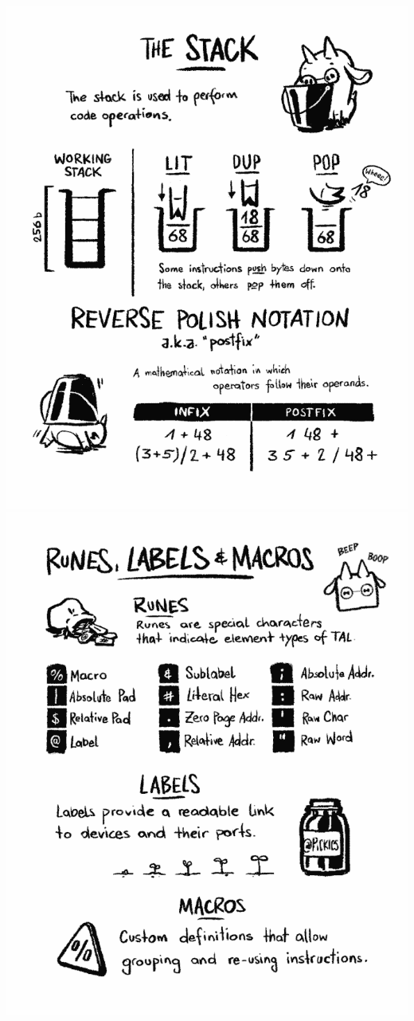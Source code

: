 \documentclass[paperheight=4.25in,paperwidth=2.75in,20pt]{article}
\begin{document}
  \includegraphics[width=1.0\paperwidth]{images/04_stack-680.png}
  \includegraphics[width=1.0\paperwidth]{images/05_runes_labels_macros-680.png}
\end{document}
